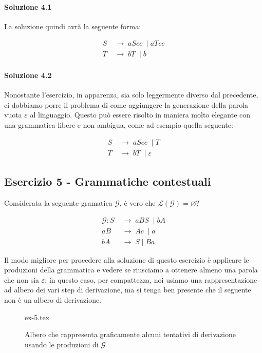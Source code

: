 \documentclass[class=book, crop=false, oneside, 12pt]{standalone}
\begin{document}
\paragraph{Soluzione 4.1}
La soluzione quindi avrà la seguente forma:

\begin{align*}
  S\; &\to\; aScc\; \mid  aTcc \\
  T\; &\to\; bT\; \mid b
\end{align*}

\paragraph{Soluzione 4.2}
Nonostante l'esercizio, in apparenza, sia solo leggermente diverso dal precedente, ci dobbiamo porre il problema di come aggiungere la generazione della parola vuota \(\varepsilon\) al linguaggio. Questo può essere risolto in maniera molto elegante con una grammatica libere e non ambigua, come ad esempio quella seguente:

\begin{align*}
  S\; &\to\; aScc\; \mid T \\
  T\; &\to\; bT\; \mid \varepsilon
\end{align*}

\subsection*{Esercizio 5 - Grammatiche contestuali}
Considerata la seguente gramatica \(\mathcal{G}\), è vero che \(\mathcal{L(G)} = \varnothing\)?

\begin{align*}
  \mathcal{G}: S\; &\to\; aBS\; \mid bA \\
  aB\; &\to\; Ac\; \mid a \\
  bA\; &\to\; S \mid Ba
\end{align*}

\noindent Il modo migliore per procedere alla soluzione di questo esercizio è applicare le produzioni della grammatica e vedere se riusciamo a ottenere almeno una parola che non sia \(\varepsilon\); in questo caso, per compattezza, noi usiamo una rappresentazione ad albero dei vari step di derivazione, ma si tenga ben presente che il seguente non è un albero di derivazione.

\begin{figure}[H]
	\centering
	{ex-5.tex}
	\caption{Albero che rappresenta graficamente alcuni tentativi di derivazione usando le produzioni di \(\mathcal{G}\)}
\end{figure}
\end{document}

